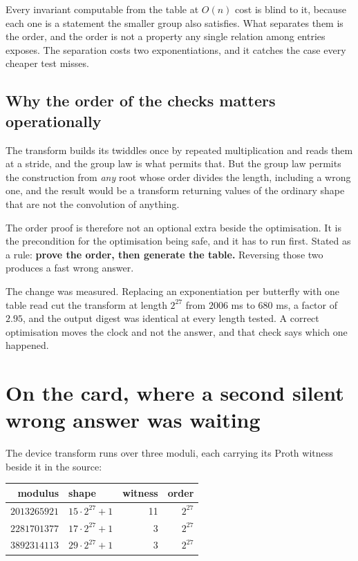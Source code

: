 Every invariant computable from the table at \(O(n)\) cost is blind to it, because each one is a statement the smaller group also satisfies. What separates them is the order, and the order is not a property any single relation among entries exposes. The separation costs two exponentiations, and it catches the case every cheaper test misses.

\subsection{Why the order of the checks matters operationally}

The transform builds its twiddles once by repeated multiplication and reads them at a stride, and the group law is what permits that. But the group law permits the construction from \emph{any} root whose order divides the length, including a wrong one, and the result would be a transform returning values of the ordinary shape that are not the convolution of anything.

The order proof is therefore not an optional extra beside the optimisation. It is the precondition for the optimisation being safe, and it has to run first. Stated as a rule: \textbf{prove the order, then generate the table.} Reversing those two produces a fast wrong answer.

The change was measured. Replacing an exponentiation per butterfly with one table read cut the transform at length \(2^{27}\) from \(2006\) ms to \(680\) ms, a factor of \(2.95\), and the output digest was identical at every length tested. A correct optimisation moves the clock and not the answer, and that check says which one happened.

\section{On the card, where a second silent wrong answer was waiting}

The device transform runs over three moduli, each carrying its Proth witness beside it in the source:

\begin{center}
\begin{tabular}{@{}rlrr@{}}
\toprule
modulus & shape & witness & order \\
\midrule
\(2013265921\) & \(15 \cdot 2^{27} + 1\) & 11 & \(2^{27}\) \\
\(2281701377\) & \(17 \cdot 2^{27} + 1\) & 3 & \(2^{27}\) \\
\(3892314113\) & \(29 \cdot 2^{27} + 1\) & 3 & \(2^{27}\) \\
\bottomrule
\end{tabular}
\end{center}

